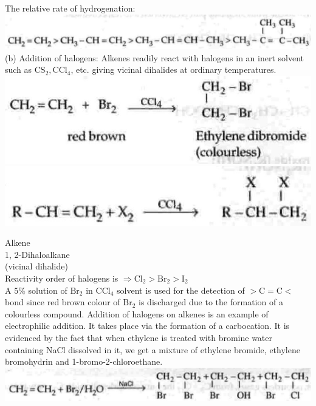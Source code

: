 \documentclass[10pt]{article}
\begin{document}
The relative rate of hydrogenation:\\
\includegraphics[max width=\textwidth, center]{2025_01_28_8470952b98110cec3aabg-180(3)}\\
(b) Addition of halogens: Alkenes readily react with halogens in an inert solvent such as $\mathrm{CS}_{2}, \mathrm{CCl}_{4}$, etc. giving vicinal dihalides at ordinary temperatures.\\
\includegraphics[max width=\textwidth, center]{2025_01_28_8470952b98110cec3aabg-180(4)}\\
\includegraphics[max width=\textwidth, center]{2025_01_28_8470952b98110cec3aabg-180}

Alkene\\
1, 2-Dihaloalkane\\
(vicinal dihalide)\\
Reactivity order of halogens is $\Rightarrow \mathrm{Cl}_{2}>\mathrm{Br}_{2}>\mathrm{I}_{2}$\\
A $5 \%$ solution of $\mathrm{Br}_{2}$ in $\mathrm{CCl}_{4}$ solvent is used for the detection of $>\mathrm{C}=\mathrm{C}<$ bond since red brown colour of $\mathrm{Br}_{2}$ is discharged due to the formation of a colourless compound. Addition of halogens on alkenes is an example of electrophilic addition. It takes place via the formation of a carbocation. It is evidenced by the fact that when ethylene is treated with bromine water containing NaCl dissolved in it, we get a mixture of ethylene bromide, ethylene bromohydrin and 1-bromo-2-chloroethane.\\
\includegraphics[max width=\textwidth, center]{2025_01_28_8470952b98110cec3aabg-180(1)}
\end{document}

